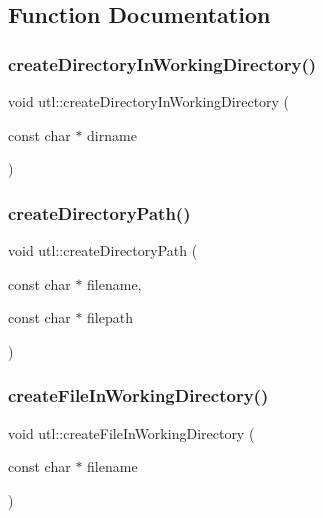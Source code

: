 \subsection{Function Documentation}
\mbox{\label{namespaceutl_ae0a8bbde71249285ee7ac90e3263d5d7}} 
\subsubsection{\texorpdfstring{create\+Directory\+In\+Working\+Directory()}{createDirectoryInWorkingDirectory()}}
{\footnotesize\ttfamily void utl\+::create\+Directory\+In\+Working\+Directory (\begin{DoxyParamCaption}\item[{const char $\ast$}]{dirname }\end{DoxyParamCaption})}

\mbox{\label{namespaceutl_a86eca520cbeb7861e95c4054b86818be}} 
\subsubsection{\texorpdfstring{create\+Directory\+Path()}{createDirectoryPath()}}
{\footnotesize\ttfamily void utl\+::create\+Directory\+Path (\begin{DoxyParamCaption}\item[{const char $\ast$}]{filename,  }\item[{const char $\ast$}]{filepath }\end{DoxyParamCaption})}

\mbox{\label{namespaceutl_a26917cac96f0f1a729f066a7f6d1f4aa}} 
\subsubsection{\texorpdfstring{create\+File\+In\+Working\+Directory()}{createFileInWorkingDirectory()}}
{\footnotesize\ttfamily void utl\+::create\+File\+In\+Working\+Directory (\begin{DoxyParamCaption}\item[{const char $\ast$}]{filename }\end{DoxyParamCaption})}

